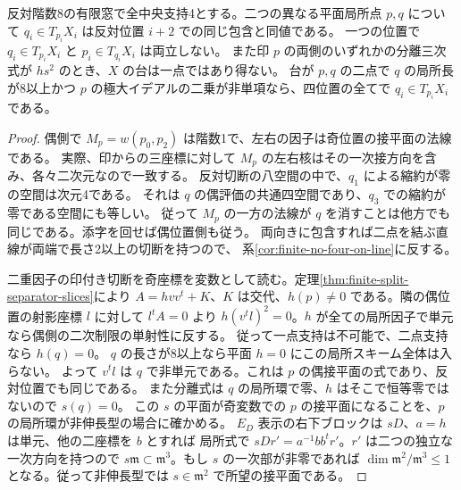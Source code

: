 \begin{proposition}\label{prop:finite-two-planar-tangent-incidence}
反対階数8の有限窓で全中央支持4とする。二つの異なる平面局所点 $p,q$ について
$q_i\in T_{p_i}X_i$ は反対位置 $i+2$ での同じ包含と同値である。
一つの位置で $q_i\in T_{p_i}X_i$ と $p_i\in T_{q_i}X_i$ は両立しない。
また印 $p$ の両側のいずれかの分離三次式が $h s^2$ のとき、$X$ の台は一点ではあり得ない。
台が $p,q$ の二点で $q$ の局所長が8以上かつ $p$ の極大イデアルの二乗が非単項なら、四位置の全てで $q_i\in T_{p_i}X_i$ である。
\end{proposition}
\begin{proof}
偶側で $M_p=w(p_0,p_2)$ は階数1で、左右の因子は奇位置の接平面の法線である。
実際、印からの三座標に対して $M_p$ の左右核はその一次接方向を含み、各々二次元なので一致する。
反対切断の八空間の中で、$q_1$ による縮約が零の空間は次元4である。
それは $q$ の偶評価の共通四空間であり、$q_3$ での縮約が零である空間にも等しい。
従って $M_p$ の一方の法線が $q$ を消すことは他方でも同じである。添字を回せば偶位置側も従う。
両向きに包含すれば二点を結ぶ直線が両端で長さ2以上の切断を持つので、
系\ref{cor:finite-no-four-on-line}に反する。

二重因子の印付き切断を奇座標を変数として読む。定理\ref{thm:finite-split-separator-slices}により
$A=h vv^t+K$、$K$ は交代、$h(p)\ne0$ である。隣の偶位置の射影座標 $l$ に対して
$l^tA=0$ より $h(v^tl)^2=0$。$h$ が全ての局所因子で単元なら偶側の二次制限の単射性に反する。
従って一点支持は不可能で、二点支持なら $h(q)=0$。
$q$ の長さが8以上なら平面 $h=0$ にこの局所スキーム全体は入らない。
よって $v^tl$ は $q$ で非単元である。これは $p$ の偶接平面の式であり、反対位置でも同じである。
また分離式は $q$ の局所環で零、$h$ はそこで恒等零ではないので $s(q)=0$。
この $s$ の平面が奇変数での $p$ の接平面になることを、$p$ の局所環が非伸長型の場合に確かめる。
$E_D$ 表示の右下ブロックは $sD$、$a=h$ は単元、他の二座標を $b$ とすれば
局所式で $sD r'=a^{-1} b b^t r'$。$r'$ は二つの独立な一次方向を持つので
$s\mathfrak m\subset\mathfrak m^3$。もし $s$ の一次部が非零であれば
$\dim\mathfrak m^2/\mathfrak m^3\le1$ となる。従って非伸長型では $s\in\mathfrak m^2$ で所望の接平面である。
\end{proof}

